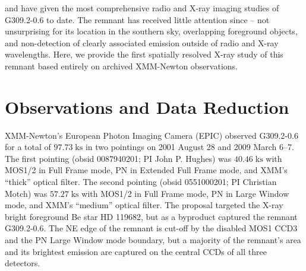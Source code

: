 \documentclass[preprint2,tighten,trackchanges]{aastex6}
\newcommand*{\mt}{\mathrm}
\newcommand*{\unit}[1]{\;\mt{#1}}  %
\begin{document}

 and  have given the most comprehensive radio and
X-ray imaging studies of G309.2-0.6 to date.
The remnant has received little attention since -- not unsurprising for its
location in the southern sky, overlapping foreground objects, and non-detection
of clearly associated emission outside of radio and X-ray wavelengths.
Here, we provide the first spatially resolved X-ray study of this remnant based
entirely on archived XMM-Newton observations.


%
%
%
%
%
%
%


\section{Observations and Data Reduction} \label{sec:obs}


XMM-Newton's European Photon Imaging Camera (EPIC) observed G309.2-0.6 for a
total of $97.73 \unit{ks}$ in two pointings on 2001 August 28 and 2009 March
6--7.  The first pointing (obsid 0087940201; PI John P. Hughes) was $40.46
\unit{ks}$ with MOS1/2 in Full Frame mode, PN in Extended Full Frame mode, and
XMM's ``thick'' optical filter.
The second pointing (obsid 0551000201; PI Christian Motch) was $57.27
\unit{ks}$  with MOS1/2 in Full Frame mode, PN in Large Window mode, and XMM's
``medium'' optical filter.  The proposal targeted the X-ray bright foreground
Be star HD 119682, but as a byproduct captured the remnant G309.2-0.6.  The NE
edge of the remnant is cut-off by the disabled MOS1 CCD3 and the PN Large
Window mode boundary, but a majority of the remnant's area and its brightest
emission are captured on the central CCDs of all three detectors.
\end{document}
